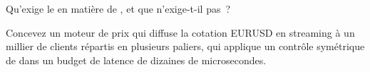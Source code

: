 \begin{interviewq}\label{iq:m2:fx-spot-microstructure:5}
Qu'exige le  en matière de , et que n'exige-t-il
pas~?
\end{interviewq}

\begin{interviewq}\label{iq:m2:fx-spot-microstructure:6}
Concevez un moteur de prix qui diffuse la cotation EURUSD en streaming à un millier de clients répartis en plusieurs
paliers, qui applique un contrôle symétrique de  dans un budget de latence de dizaines
de microsecondes.
\end{interviewq}
